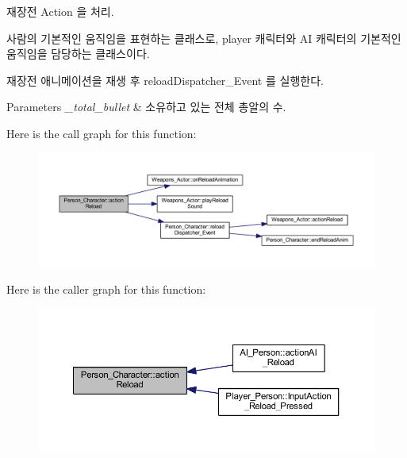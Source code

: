 재장전 Action 을 처리. 

사람의 기본적인 움직임을 표현하는 클래스로, player 캐릭터와 AI 캐릭터의 기본적인 움직임을 담당하는 클래스이다.

재장전 애니메이션을 재생 후 reload\+Dispatcher\+\_\+\+Event 를 실행한다. 
\begin{DoxyParams}{Parameters}
{\em \+\_\+total\+\_\+bullet} & 소유하고 있는 전체 총알의 수. \\
\hline
\end{DoxyParams}


Here is the call graph for this function\+:\nopagebreak
\begin{figure}[H]
\begin{center}
\leavevmode
\includegraphics[width=350pt]{class_person___character_a593f0cb97f1f20e42c4ac6642f7dcefe_cgraph}
\end{center}
\end{figure}




Here is the caller graph for this function\+:
\nopagebreak
\begin{figure}[H]
\begin{center}
\leavevmode
\includegraphics[width=350pt]{class_person___character_a593f0cb97f1f20e42c4ac6642f7dcefe_icgraph}
\end{center}
\end{figure}


